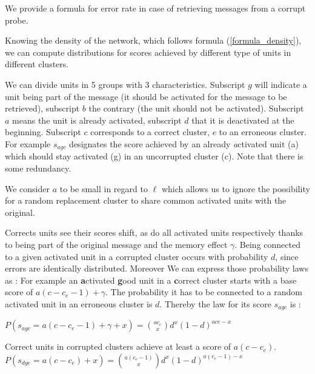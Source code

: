 \documentclass[english,10pt,twocolumn]{IEEEtran}
\theoremstyle{definition}
\begin{document}
	We provide a formula for error rate in case of retrieving messages from a corrupt probe.

	
	Knowing the density of the network, which follows formula (\ref{formula_density}), we can compute distributions for scores achieved by different type of units in different clusters.
	
	We can divide units in 5 groups with 3 characteristics. Subscript $g$ will indicate a unit being part of the message (it should be activated for the message to be retrieved), subscript $b$ the contrary (the unit should not be activated). Subscript $a$ means the unit is already activated, subscript $d$ that it is deactivated at the beginning. Subscript $c$ corresponds to a correct cluster, $e$ to an erroneous cluster. For example $s_{agc}$ designates the score achieved by an already \emph{a}ctivated unit (a) which should stay activated (g) in an uncorrupted cluster (c). Note that there is some redundancy.
	
	We consider $a$ to be small in regard to $\ell$ which allows us to ignore the possibility for a random replacement cluster to share common activated units with the original.
	
	Corrects units see their scores shift, as do all activated units respectively thanks to being part of the original message and the memory effect $\gamma$.
	Being connected to a given activated unit in a corrupted cluster occurs with probability $d$, since errors are identically distributed. Moreover  We can express those probability laws as : 
	For example an \textbf{a}ctivated \textbf{g}ood unit in a \textbf{c}orrect cluster starts with a base score of $ a(c - c_e - 1) + \gamma$. The probability it has to be connected to a random activated unit in an erroneous cluster is $d$. Thereby the law for its score $s_{agc}$ is :
	
	$P(s_{agc} = a(c - c_e - 1) + \gamma + x) = {a c_e \choose x} d^x (1-d)^{a ce-x}$
	
	Correct units in corrupted clusters achieve at least a score of $a(c - c_e)$. 
	$P(s_{dge} = a(c - c_e) + x) = {a (c_e - 1) \choose x} d^x (1-d)^{a (c_e - 1)-x}$
	
\end{document}
